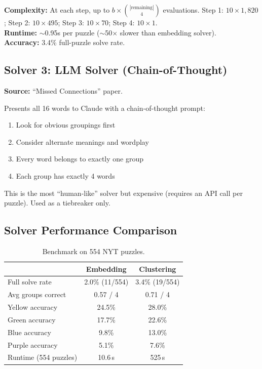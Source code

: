 \documentclass[11pt, letterpaper]{article}
\begin{document}
\textbf{Complexity:} At each step, up to $b \times \binom{|\text{remaining}|}{4}$ evaluations. Step 1: $10 \times 1{,}820$; Step 2: $10 \times 495$; Step 3: $10 \times 70$; Step 4: $10 \times 1$.\\
\textbf{Runtime:} $\sim$0.95s per puzzle ($\sim$50$\times$ slower than embedding solver).\\
\textbf{Accuracy:} 3.4\% full-puzzle solve rate.

\subsection{Solver 3: LLM Solver (Chain-of-Thought)}

\textbf{Source:} ``Missed Connections'' paper.

Presents all 16 words to Claude with a chain-of-thought prompt:
\begin{enumerate}[nosep]
    \item Look for obvious groupings first
    \item Consider alternate meanings and wordplay
    \item Every word belongs to exactly one group
    \item Each group has exactly 4 words
\end{enumerate}

This is the most ``human-like'' solver but expensive (requires an API call per puzzle). Used as a tiebreaker only.

\subsection{Solver Performance Comparison}

\begin{table}[H]
\centering
\caption{Benchmark on 554 NYT puzzles.}
\begin{tabular}{@{}lcc@{}}
\toprule
& Embedding & Clustering \\
\midrule
Full solve rate & 2.0\% (11/554) & 3.4\% (19/554) \\
Avg groups correct & 0.57 / 4 & 0.71 / 4 \\
\midrule
\colorbox{yellow_conn}{Yellow} accuracy & 24.5\% & 28.0\% \\
\colorbox{green_conn}{Green} accuracy & 17.7\% & 22.6\% \\
\colorbox{blue_conn}{Blue} accuracy & 9.8\% & 13.0\% \\
\colorbox{purple_conn}{Purple} accuracy & 5.1\% & 7.6\% \\
\midrule
Runtime (554 puzzles) & 10.6\,s & 525\,s \\
\bottomrule
\end{tabular}
\end{table}
\end{document}
